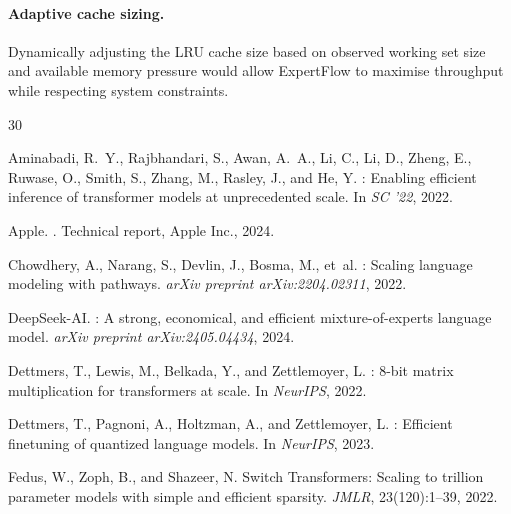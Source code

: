 \documentclass[11pt,a4paper]{article}
\begin{document}
\paragraph{Adaptive cache sizing.} Dynamically adjusting the LRU cache size
based on observed working set size and available memory pressure would allow
ExpertFlow to maximise throughput while respecting system constraints.



\begin{thebibliography}{30}

Aminabadi, R.~Y., Rajbhandari, S., Awan, A.~A., Li, C., Li, D., Zheng, E.,
  Ruwase, O., Smith, S., Zhang, M., Rasley, J., and He, Y.
: Enabling efficient inference of transformer
  models at unprecedented scale.
\newblock In \emph{SC '22}, 2022.

Apple.
.
\newblock Technical report, Apple Inc., 2024.

Chowdhery, A., Narang, S., Devlin, J., Bosma, M., et~al.
: Scaling language modeling with pathways.
\newblock \emph{arXiv preprint arXiv:2204.02311}, 2022.

{DeepSeek-AI}.
: A strong, economical, and efficient
  mixture-of-experts language model.
\newblock \emph{arXiv preprint arXiv:2405.04434}, 2024.

Dettmers, T., Lewis, M., Belkada, Y., and Zettlemoyer, L.
: 8-bit matrix multiplication for transformers at scale.
\newblock In \emph{NeurIPS}, 2022.

Dettmers, T., Pagnoni, A., Holtzman, A., and Zettlemoyer, L.
: Efficient finetuning of quantized language models.
\newblock In \emph{NeurIPS}, 2023.

Fedus, W., Zoph, B., and Shazeer, N.
\newblock Switch Transformers: Scaling to trillion parameter models with simple
  and efficient sparsity.
\newblock \emph{JMLR}, 23(120):1--39, 2022.


\end{thebibliography}
\end{document}
